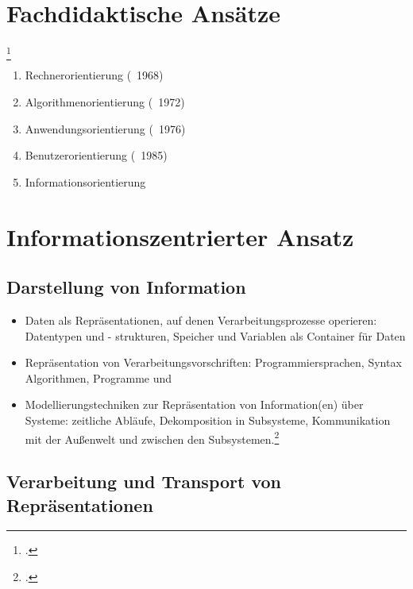\documentclass{lehramt-informatik-haupt}
\begin{document}
%

\section{Fachdidaktische Ansätze}\footcite[Forneck.1990, Seite 12]{ddi:fs:1}

\begin{enumerate}
\item Rechnerorientierung (~1968)
\item Algorithmenorientierung (~1972)
\item Anwendungsorientierung (~1976)
\item Benutzerorientierung (~1985)
\item Informationsorientierung
\end{enumerate}

%

\section{Informationszentrierter Ansatz}

%

\subsection{Darstellung von Information}
\begin{itemize}
\item Daten als Repräsentationen, auf denen Verarbeitungsprozesse
operieren: Datentypen und - strukturen, Speicher und Variablen als
Container für Daten

\item Repräsentation von Verarbeitungsvorschriften: Programmiersprachen,
Syntax Algorithmen, Programme und

\item Modellierungstechniken zur Repräsentation von Information(en) über
Systeme: zeitliche Abläufe, Dekomposition in Subsysteme, Kommunikation
mit der Außenwelt und zwischen den Subsystemen.\footcite[Seite 26,
Hubwieser.2000]{ddi:fs:1}
\end{itemize}

%

\subsection{Verarbeitung und Transport von Repräsentationen}
\end{document}
